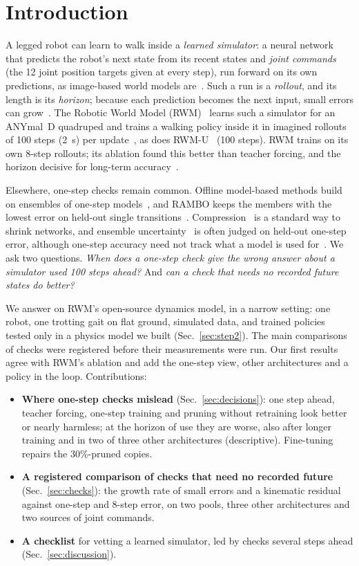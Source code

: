 \section{Introduction}\label{sec:intro}
A legged robot can learn to walk inside a \emph{learned simulator}: a neural network that predicts the robot's next
state from its recent states and \emph{joint commands} (the 12 joint position targets given at every step), run
forward on its own predictions, as image-based world models are~\cite{hafner2025}. Such a run is a \emph{rollout},
and its length is its \emph{horizon}; because each prediction becomes the next input, small errors can
grow~\cite{venkatraman2015,talvitie2017,lambert2022compounding,janner2019}. The Robotic World Model
(RWM)~\cite{li2025rwm} learns such a simulator for an ANYmal~D quadruped and trains a walking policy inside it in imagined rollouts of
100 steps (2~s) per update~\cite[Table~S11]{li2025rwm}, as does RWM-U~\cite{li2025rwmu}
(100 steps). RWM trains on its own 8-step
rollouts; its ablation found this better than teacher forcing, and the horizon decisive for long-term
accuracy~\cite[Sec.~4.3, App.~A.4.1]{li2025rwm}.

Elsewhere, one-step checks remain common. Offline model-based methods build on ensembles of one-step
models~\cite{yu2020mopo,yu2021combo}, and RAMBO keeps the members with the lowest error on held-out single
transitions~\cite{rigter2022rambo}. Compression~\cite{han2016} is a standard way to shrink networks, and ensemble uncertainty~\cite{chua2018,yu2020mopo}
is often judged on held-out one-step error, although one-step accuracy need not track what a model is used
for~\cite{lambert2020objective}. We ask two questions. \emph{When does a one-step check give the wrong answer about a
simulator used 100 steps ahead?} And \emph{can a check that needs no recorded future states do better?}

We answer on RWM's open-source dynamics model, in a narrow setting: one robot, one trotting gait on flat ground,
simulated data, and trained policies tested only in a physics model we built (Sec.~\ref{sec:step2}). The main comparisons of checks were
registered before their measurements were run. Our first results agree with RWM's ablation and add the one-step view,
other architectures and a policy in the loop. Contributions:
\begin{itemize}
\item \textbf{Where one-step checks mislead} (Sec.~\ref{sec:decisions}): one step ahead, teacher forcing, one-step
training and pruning without retraining look better or nearly harmless; at the horizon of use they are worse, also
after longer training and in two of three other architectures (descriptive). Fine-tuning repairs the 30\%-pruned copies.
\item \textbf{A registered comparison of checks that need no recorded future} (Sec.~\ref{sec:checks}): the growth
rate of small errors and a kinematic residual against one-step and 8-step error, on two pools, three other
architectures and two sources of joint commands.
\item \textbf{A checklist} for vetting a learned simulator, led by checks several steps ahead (Sec.~\ref{sec:discussion}).
\end{itemize}

